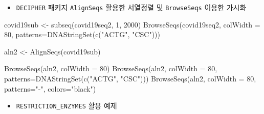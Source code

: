 \documentclass[
]{book}
\newenvironment{Shaded}{\begin{snugshade}}{\end{snugshade}}
\newcommand{\AttributeTok}[1]{\textcolor[rgb]{0.77,0.63,0.00}{#1}}
\newcommand{\DecValTok}[1]{\textcolor[rgb]{0.00,0.00,0.81}{#1}}
\newcommand{\FunctionTok}[1]{\textcolor[rgb]{0.00,0.00,0.00}{#1}}
\newcommand{\NormalTok}[1]{#1}
\newcommand{\OtherTok}[1]{\textcolor[rgb]{0.56,0.35,0.01}{#1}}
\newcommand{\StringTok}[1]{\textcolor[rgb]{0.31,0.60,0.02}{#1}}
\providecommand{\tightlist}{%
  \setlength{\itemsep}{0pt}\setlength{\parskip}{0pt}}
\begin{document}
\begin{itemize}
\tightlist
\item
  \texttt{DECIPHER} 패키지 \texttt{AlignSeqs} 활용한 서열정렬 및 \texttt{BrowseSeqs} 이용한 가시화
\end{itemize}

\begin{Shaded}
\begin{Highlighting}[]

\NormalTok{covid19sub }\OtherTok{\textless{}{-}} \FunctionTok{subseq}\NormalTok{(covid19seq2, }\DecValTok{1}\NormalTok{, }\DecValTok{2000}\NormalTok{)}
\FunctionTok{BrowseSeqs}\NormalTok{(covid19seq2, }\AttributeTok{colWidth =} \DecValTok{80}\NormalTok{, }\AttributeTok{patterns=}\FunctionTok{DNAStringSet}\NormalTok{(}\FunctionTok{c}\NormalTok{(}\StringTok{"ACTG"}\NormalTok{, }\StringTok{"CSC"}\NormalTok{)))}


\NormalTok{aln2 }\OtherTok{\textless{}{-}} \FunctionTok{AlignSeqs}\NormalTok{(covid19sub)}

\FunctionTok{BrowseSeqs}\NormalTok{(aln2, }\AttributeTok{colWidth =} \DecValTok{80}\NormalTok{)}
\FunctionTok{BrowseSeqs}\NormalTok{(aln2, }\AttributeTok{colWidth =} \DecValTok{80}\NormalTok{, }\AttributeTok{patterns=}\FunctionTok{DNAStringSet}\NormalTok{(}\FunctionTok{c}\NormalTok{(}\StringTok{"ACTG"}\NormalTok{, }\StringTok{"CSC"}\NormalTok{)))}
\FunctionTok{BrowseSeqs}\NormalTok{(aln2, }\AttributeTok{colWidth =} \DecValTok{80}\NormalTok{, }\AttributeTok{patterns=}\StringTok{"{-}"}\NormalTok{, }\AttributeTok{colors=}\StringTok{"black"}\NormalTok{)}
\end{Highlighting}
\end{Shaded}

\begin{itemize}
\tightlist
\item
  \texttt{RESTRICTION\_ENZYMES} 활용 예제
\end{itemize}
\end{document}
